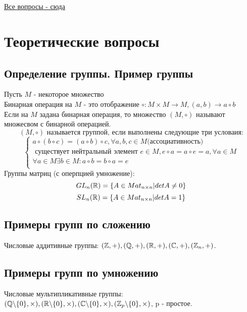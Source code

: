 

\section*{}
\begin{center}
\href{https://t.me/booarr}{Все вопросы - сюда}
\end{center}

	\tableofcontents %

	\section{Теоретические вопросы}
	\subsection{Определение группы. Пример группы}
	Пусть $M$ - некоторое множество \\
	Бинарная операция на $M$ - это отображение $\circ : M\times M \to M, (a,b)\to a\circ b$\\
	Если на $M$ задана бинарная операция, то множество $(M,\circ) $ называют множесвом с бинарной операцией. \\
	$$\left(M,\circ\right) \text{ называется группой, если выполнены следующие три условаия:}$$
	$$\begin{cases}
		a\circ(b\circ c) = (a\circ b)\circ c , \forall a,b,c \in M \text{(ассоциативность)} \\
		\text{ существует нейтральный элемент } e \in M, e\circ a = a\circ e = a , \forall a\in M\\
		\forall a\in M \exists b\in M : a\circ b = b\circ a = e \\
	\end{cases}$$
	Группы матриц (с оперпцией умножение): \\
	$$GL_n(\mathbb{R}) = \{A\in Mat_{n\times n}| detA\ne 0\}$$
	$$SL_n(\mathbb{R}) = \{A\in Mat_{n\times n}| detA= 1\}$$
	
	\subsection{Примеры групп по сложению}
	Числовые аддитивные группы: $(\mathbb{Z}, +), (\mathbb{Q}, +), (\mathbb{R}, +), (\mathbb{C} , +), (\mathbb{Z}_n,+)$.
		\subsection{Примеры групп по умножению}
		Числовые мультипликативные группы: $ (\mathbb{Q}\backslash\{0\}, \times), (\mathbb{R}\backslash\{0\}, \times), (\mathbb{C}\backslash\{0\}, \times), (\mathbb{Z}_p\backslash\{0\}, \times)$, p - простое.

